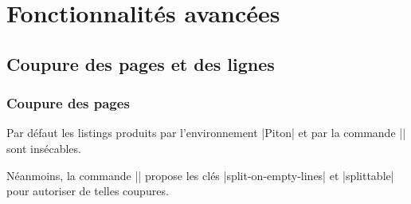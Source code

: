 \documentclass[dvipsnames,svgnames]{article}
\begin{document}
\section{Fonctionnalités avancées}


\subsection{Coupure des pages et des lignes}

\label{breakable}

\subsubsection{Coupure des pages}


Par défaut les listings produits par l'environnement |{Piton}| et par la commande |\PitonInputFile| sont
insécables.


Néanmoins, la commande |\PitonOptions| propose les clés |split-on-empty-lines| et |splittable| pour autoriser de
telles coupures. 
\end{document}
